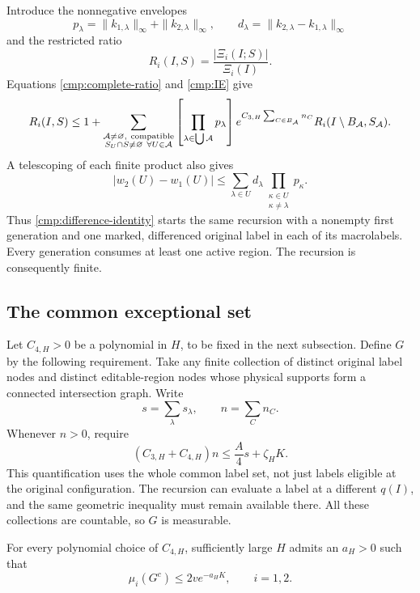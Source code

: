 Introduce the nonnegative envelopes
\[
 p_\lambda=\|k_{1,\lambda}\|_\infty+
                         \|k_{2,\lambda}\|_\infty,\qquad
 d_\lambda=\|k_{2,\lambda}-k_{1,\lambda}\|_\infty
\]
and the restricted ratio
\[
 R_i(I,S)=\frac{|\Xi_i(I;S)|}{\Xi_i(I)}.
\]
Equations \eqref{cmp:complete-ratio} and \eqref{cmp:IE} give
\begin{equation}
 R_i(I,S)\le1+
 \sum_{\substack{{\cal A}\ne\varnothing,\ {\rm compatible}\\
                         S_U\cap S\ne\varnothing\ \forall U\in{\cal A}}}
 \left[\prod_{\lambda\in\bigcup{\cal A}}p_\lambda\right]
 e^{C_{3,H}\sum_{C\in B_{\cal A}}n_C}
 R_i(I\setminus B_{\cal A},S_{\cal A}).
 \label{cmp:ratio-recursion}
\end{equation}
A telescoping of each finite product also gives
\begin{equation}
 |w_2(U)-w_1(U)|
 \le\sum_{\lambda\in U}d_\lambda
                   \prod_{\substack{\kappa\in U\\\kappa\ne\lambda}}
                          p_\kappa .
 \label{cmp:marked-macro}
\end{equation}
Thus \eqref{cmp:difference-identity} starts the same recursion with a
nonempty first generation and one marked, differenced original label
in each of its macrolabels.  Every generation consumes at least one
active region.  The recursion is consequently finite.

\subsection{The common exceptional set}

Let \(C_{4,H}>0\) be a polynomial in \(H\), to be fixed in the next
subsection.  Define \(G\) by the following requirement.  Take any finite
collection of distinct original label nodes and distinct editable-region
nodes whose physical supports form a connected intersection graph.
Write
\[
 s=\sum_{\lambda}s_\lambda,\qquad n=\sum_C n_C.
\]
Whenever \(n>0\), require
\begin{equation}
 (C_{3,H}+C_{4,H})n\le \frac A4s+\zeta_HK.
 \label{cmp:good-set}
\end{equation}
This quantification uses the whole common label set, not just labels
eligible at the original configuration.  The recursion can evaluate a
label at a different \(q(I)\), and the same geometric inequality must
remain available there.  All these collections are countable, so \(G\)
is measurable.

\begin{lemma}
\label{cmp:exceptional}
For every polynomial choice of \(C_{4,H}\), sufficiently large \(H\)
admits an \(a_H>0\) such that
\begin{equation}
 \mu_i(G^c)\le2v e^{-a_HK},\qquad i=1,2 .
 \label{cmp:exceptional-bound}
\end{equation}
\end{lemma}

